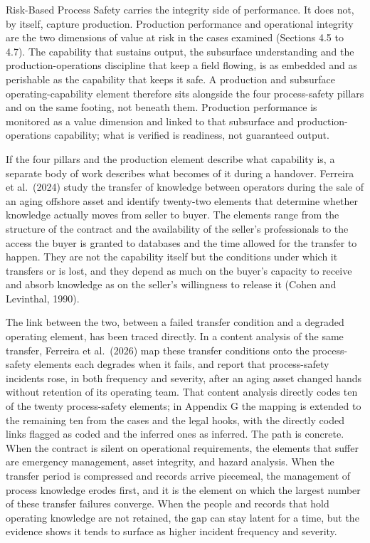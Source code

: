 \documentclass[twoside,fontset=lmodern]{mitthesis}
\begin{document}
Risk-Based Process Safety carries the integrity side of performance. It
does not, by itself, capture production. Production performance and
operational integrity are the two dimensions of value at risk in the
cases examined (Sections 4.5 to 4.7). The capability that sustains
output, the subsurface understanding and the production-operations
discipline that keep a field flowing, is as embedded and as perishable
as the capability that keeps it safe. A production and subsurface
operating-capability element therefore sits alongside the four
process-safety pillars and on the same footing, not beneath them.
Production performance is monitored as a value dimension and linked to
that subsurface and production-operations capability; what is verified
is readiness, not guaranteed output.

If the four pillars and the production element describe what capability
is, a separate body of work describes what becomes of it during a
handover. Ferreira et al.~(2024) study the transfer of knowledge between
operators during the sale of an aging offshore asset and identify
twenty-two elements that determine whether knowledge actually moves from
seller to buyer. The elements range from the structure of the contract
and the availability of the seller's professionals to the access the
buyer is granted to databases and the time allowed for the transfer to
happen. They are not the capability itself but the conditions under
which it transfers or is lost, and they depend as much on the buyer's
capacity to receive and absorb knowledge as on the seller's willingness
to release it (Cohen and Levinthal, 1990).

The link between the two, between a failed transfer condition and a
degraded operating element, has been traced directly. In a content
analysis of the same transfer, Ferreira et al.~(2026) map these transfer
conditions onto the process-safety elements each degrades when it fails,
and report that process-safety incidents rose, in both frequency and
severity, after an aging asset changed hands without retention of its
operating team. That content analysis directly codes ten of the twenty
process-safety elements; in Appendix G the mapping is extended to the
remaining ten from the cases and the legal hooks, with the directly
coded links flagged as coded and the inferred ones as inferred. The path
is concrete. When the contract is silent on operational requirements,
the elements that suffer are emergency management, asset integrity, and
hazard analysis. When the transfer period is compressed and records
arrive piecemeal, the management of process knowledge erodes first, and
it is the element on which the largest number of these transfer failures
converge. When the people and records that hold operating knowledge are
not retained, the gap can stay latent for a time, but the evidence shows
it tends to surface as higher incident frequency and severity.
\end{document}

